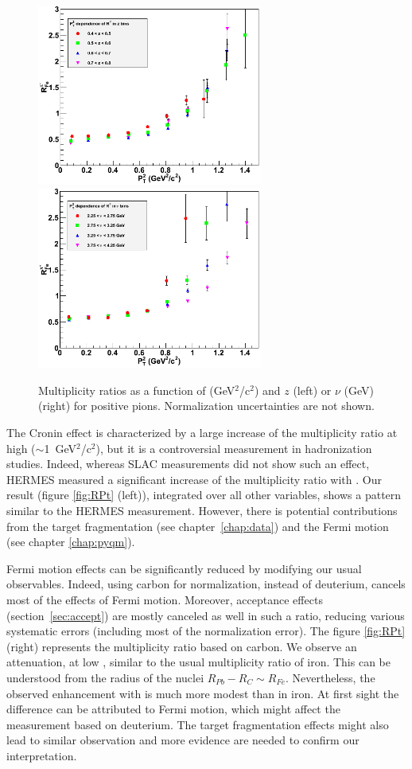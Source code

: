 \begin{figure}[p]
\centering
\includegraphics[width=7.4cm] {chap6-fig/F_RvPtinZ.png} 
\includegraphics[width=7.4cm] {chap6-fig/F_RvPtinNu.png} 
\caption {Multiplicity ratios as a function of \pt (GeV$^2$/c$^2$) and $z$ (left) 
or $\nu$ (GeV) (right) for positive pions. Normalization uncertainties are not shown.}
\label{fig:RPtMulti}
\end{figure}

The Cronin effect is characterized by a large increase of the multiplicity 
ratio at high \pt ($\sim$1~GeV$^2$/c$^2$), but it is a controversial 
measurement in hadronization studies. Indeed, whereas SLAC measurements 
\cite{Osborne:1978ai} did not show such an effect, HERMES 
\cite{Airapetian:2007vu} measured a significant increase of the multiplicity 
ratio with \ptp. Our result (figure \ref{fig:RPt} (left)), integrated over 
all other variables, shows a pattern similar to the HERMES measurement. 
However, there is potential contributions from the target fragmentation (see 
chapter~\ref{chap:data}) and the Fermi motion (see chapter \ref{chap:pyqm}).

Fermi motion effects can be significantly reduced by modifying 
our usual observables. Indeed, using carbon for normalization, instead of deuterium, 
cancels most of the effects of Fermi motion. Moreover, acceptance 
effects (section~\ref{sec:accept}) are mostly canceled as well in such a ratio, 
reducing various systematic errors (including most of the normalization error). 
The figure \ref{fig:RPt} (right) represents the multiplicity ratio based on carbon. We 
observe an attenuation, at low \ptp, similar to the usual multiplicity ratio 
of iron. This can be understood from the radius of the nuclei $R_{Pb}-R_{C} 
\sim R_{Fe}$. Nevertheless, the observed enhancement with \pt is much more modest than in 
iron. At first sight the difference can be attributed to Fermi motion, which 
might affect the measurement based on deuterium. The target fragmentation 
effects might also lead to similar observation and more evidence are 
needed to confirm our interpretation.

